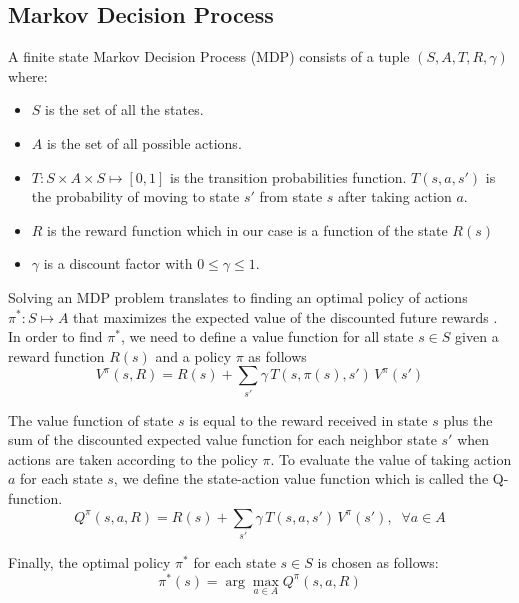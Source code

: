 \documentclass[letterpaper, 10 pt, conference]{ieeeconf}  %
\newcommand\NB[1]{$\spadesuit$\footnote{NB: #1}}
\begin{document}
\subsection{Markov Decision Process}
A finite state Markov Decision Process (MDP) \cite{puterman2014markov} consists of a tuple $(S,A,T,R,\gamma)$ where:
\begin{itemize}
    \item $S$ is the set of all the states.
    \item $A$ is the set of all possible actions.
    \item $T : S\times A\times S \mapsto [0,1]$ is the transition probabilities function. $T(s,a,s')$ is the probability of moving to state $s'$ from state $s$ after taking action $a$.
    \item $R$ is the reward function which in our case is a function of the state $R(s)$
    \item $\gamma$ is a discount factor with $0\leq\gamma\leq1$.
\end{itemize}
Solving an MDP problem translates to finding an optimal policy of actions $\pi^*: S \mapsto A$ that maximizes the expected value of the discounted future rewards \cite{bezzo2016stochastic}.
In order to find $\pi^*$, we need to define a value function for all state $s \in S$ given a reward function $R(s)$ and a policy $\pi$ as follows 
\begin{equation}
V^\pi(s,R) = R(s) + \sum_{s'}\gamma\,T(s,\pi(s),s')\,V^\pi(s') 
\end{equation}

The value function of state $s$ is equal to the reward received in state $s$ plus the sum of the discounted expected value function for each neighbor state $s'$ when actions are taken according to the policy $\pi$.
To evaluate the value of taking action $a$ for each state $s$, we define the state-action value function which is called the Q-function.
\begin{equation}
Q^\pi(s,a,R) = R(s) + \sum_{s'} \gamma\,T(s,a,s')\,V^\pi(s'), \;\; \forall a \in A
\end{equation}

Finally, the optimal policy $\pi^*$ for each state $s \in S$ is chosen as follows:
\begin{equation}
\pi^*(s) = \arg\!\max_{a\in A} Q^\pi(s,a,R)
\end{equation}
\end{document}
